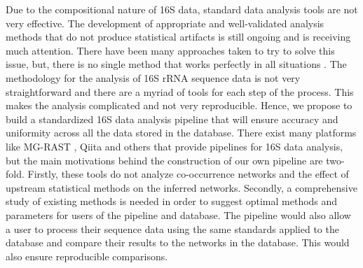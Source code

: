   Due to the compositional nature of 16S data, standard data analysis tools are not very effective.
  The development of appropriate and well-validated analysis methods that do not produce statistical artifacts is still ongoing and is receiving much attention. There have been many approaches taken to try to solve this issue, but, there is no single method that works perfectly in all situations \cite{Golob2017,Weiss2016}.
  The methodology for the analysis of 16S rRNA sequence data is not very straightforward and there are a myriad of tools for each step of the process.
  This makes the analysis complicated and not very reproducible.
  Hence, we propose to build a standardized 16S data analysis pipeline that will ensure accuracy and uniformity across all the data stored in the database.
  There exist many platforms like MG-RAST \cite{Keegan2016}, Qiita \cite{qiita} and others that provide pipelines for 16S data analysis, but the main motivations behind the construction of our own pipeline are two-fold.
  Firstly, these tools do not analyze co-occurrence networks and the effect of upstream statistical methods on the inferred networks.
  Secondly, a comprehensive study of existing methods is needed in order to suggest optimal methods and parameters for users of the pipeline and database.
  The pipeline would also allow a user to process their sequence data using the same standards applied to the database and compare their results to the networks in the database.
  This would also ensure reproducible comparisons.
